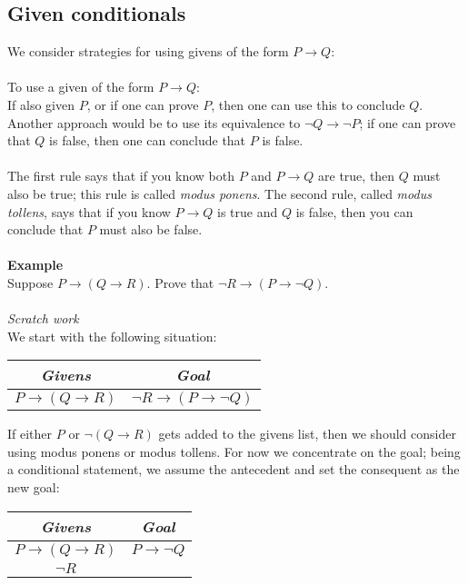 \documentclass{report}
\begin{document}
\subsection{Given conditionals}
We consider strategies for using givens of the form $P\to Q$:\\
\vspace{1mm}\\
\indent To use a given of the form $P\to Q$:\\
\indent If also given $P$, or if one can prove $P$, then one can use this to conclude $Q$. Another approach would be to use its equivalence to $\neg Q\to\neg P$; if one can prove that
$Q$ is false, then one can conclude that $P$ is false.\\
\vspace{1mm}\\
The first rule says that if you know both $P$ and $P\to Q$ are true, then $Q$ must also be true; this rule is called \textit{modus ponens}. The second rule, called \textit{modus tollens}, 
says that if you know $P\to Q$ is true and $Q$ is false, then you can conclude that $P$ must also be false.\\
\vspace{1mm}\\
\textbf{Example}\\
Suppose $P\to(Q\to R)$. Prove that $\neg R\to(P\to\neg Q)$.\\
\vspace{1mm}\\
\textit{Scratch work}\\
We start with the following situation:
\begin{center}
\begin{tabular}{c|c}
\textit{Givens}&\textit{Goal}\\
\hline
$P\to(Q\to R)$&$\neg R\to(P\to\neg Q)$\\
\end{tabular}
\end{center}
If either $P$ or $\neg(Q\to R)$ gets added to the givens list, then we should consider using modus ponens or modus tollens. For now we concentrate on the goal; being a conditional statement, 
we assume the antecedent and set the consequent as the new goal:
\begin{center}
\begin{tabular}{c|c}
\textit{Givens}&\textit{Goal}\\
\hline
$P\to(Q\to R)$&$P\to\neg Q$\\
$\neg R$&
\end{tabular}
\end{center}
\end{document}
